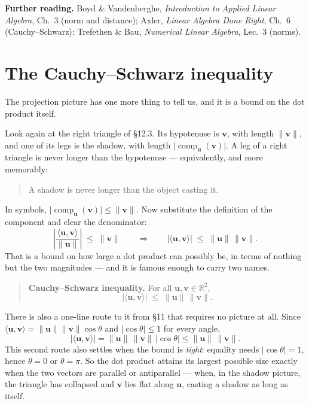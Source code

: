 \documentclass[11pt]{article}
\theoremstyle{definition}
\theoremstyle{remark}
\newcommand{\R}{\mathbb{R}}
\newcommand{\vc}[1]{\mathbf{#1}}
\newcommand{\norm}[1]{\lVert #1\rVert}
\newcommand{\comp}[2]{\operatorname{comp}_{#1}(#2)}
\begin{document}
\medskip
\noindent\textbf{Further reading.}
Boyd \& Vandenberghe, \emph{Introduction to Applied Linear Algebra}, Ch.~3
(norm and distance);
Axler, \emph{Linear Algebra Done Right}, Ch.~6 (Cauchy--Schwarz);
Trefethen \& Bau, \emph{Numerical Linear Algebra}, Lec.~3 (norms).

\section{The Cauchy--Schwarz inequality}
The projection picture has one more thing to tell us, and it is a bound on the
dot product itself.

Look again at the right triangle of \S12.3. Its hypotenuse is $\vc{v}$, with
length $\norm{\vc{v}}$, and one of its legs is the shadow, with length
$\lvert\comp{\vc{u}}{\vc{v}}\rvert$. A leg of a right triangle is never longer
than the hypotenuse --- equivalently, and more memorably:

\begin{quote}
A shadow is never longer than the object casting it.
\end{quote}

\noindent In symbols, $\lvert\comp{\vc{u}}{\vc{v}}\rvert\le\norm{\vc{v}}$. Now
substitute the definition of the component and clear the denominator:
\[
  \left\lvert\frac{\langle\vc{u},\vc{v}\rangle}{\norm{\vc{u}}}\right\rvert
  \;\le\; \norm{\vc{v}}
  \qquad\Longrightarrow\qquad
  \lvert\langle\vc{u},\vc{v}\rangle\rvert \;\le\; \norm{\vc{u}}\,\norm{\vc{v}} .
\]
That is a bound on how large a dot product can possibly be, in terms of nothing
but the two magnitudes --- and it is famous enough to carry two names.

\begin{quote}
\textbf{Cauchy--Schwarz inequality.} For all $\vc{u},\vc{v}\in\R^{2}$,
\[
  \bigl\lvert\langle\vc{u},\vc{v}\rangle\bigr\rvert
  \;\le\;
  \norm{\vc{u}}\,\norm{\vc{v}} .
\]
\end{quote}

\noindent There is also a one-line route to it from \S11 that requires no
picture at all. Since $\langle\vc{u},\vc{v}\rangle=\norm{\vc{u}}\norm{\vc{v}}\cos\theta$
and $\lvert\cos\theta\rvert\le1$ for every angle,
\[
  \bigl\lvert\langle\vc{u},\vc{v}\rangle\bigr\rvert
  = \norm{\vc{u}}\,\norm{\vc{v}}\,\lvert\cos\theta\rvert
  \le \norm{\vc{u}}\,\norm{\vc{v}} .
\]
This second route also settles when the bound is \emph{tight}: equality needs
$\lvert\cos\theta\rvert=1$, hence $\theta=0$ or $\theta=\pi$. So the dot product
attains its largest possible size exactly when the two vectors are parallel or
antiparallel --- when, in the shadow picture, the triangle has collapsed and
$\vc{v}$ lies flat along $\vc{u}$, casting a shadow as long as itself.
\end{document}
